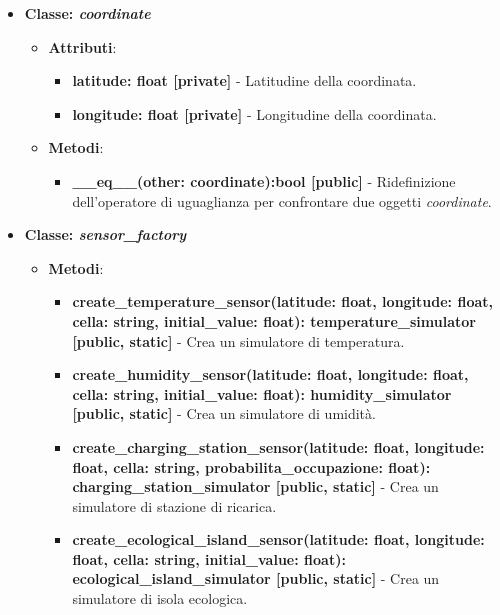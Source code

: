 \begin{itemize}
    \item{\textbf{Classe: \textit{coordinate}}}
    \begin{itemize}
        \item \textbf{Attributi}: 
        \begin{itemize}
            \item \textbf{latitude: float [private]} - Latitudine della coordinata.
            \item \textbf{longitude: float [private]} - Longitudine della coordinata.
        \end{itemize}
        \item \textbf{Metodi}: 
        \begin{itemize}
            \item \textbf{\_\_eq\_\_(other: coordinate):bool [public]} - Ridefinizione dell'operatore di uguaglianza per confrontare due oggetti \textit{coordinate}.
        \end{itemize}
    \end{itemize}

    \item{\textbf{Classe: \textit{sensor\_factory}}}
    \begin{itemize}
        \item \textbf{Metodi}: 
        \begin{itemize}
            \item \textbf{create\_temperature\_sensor(latitude: float, longitude: float, cella: string, initial\_value: float): temperature\_simulator [public, static]} - Crea un simulatore di temperatura.

            \item \textbf{create\_humidity\_sensor(latitude: float, longitude: float, cella: string, initial\_value: float): humidity\_simulator [public, static]} - Crea un simulatore di umidità.
            
            \item \textbf{create\_charging\_station\_sensor(latitude: float, longitude: float, cella: string, probabilita\_occupazione: float): charging\_station\_simulator [public, static]} - Crea un simulatore di stazione di ricarica.
            
            \item \textbf{create\_ecological\_island\_sensor(latitude: float, longitude: float, cella: string, initial\_value: float): ecological\_island\_simulator [public, static]} - Crea un simulatore di isola ecologica.
            

\end{itemize}
\end{itemize}
\end{itemize}
